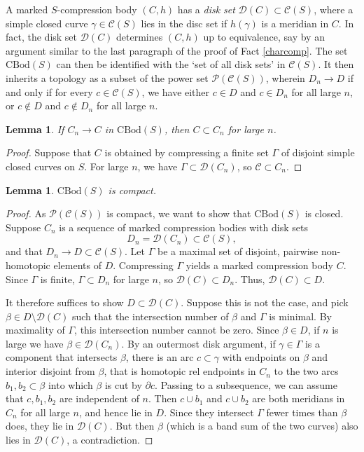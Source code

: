 \documentclass[12pt]{amsart}
\newtheorem{lemma}[theorem]{Lemma}
\theoremstyle{definition}
\theoremstyle{remark}
\begin{document}
A marked $S$-compression body $(C,h)$ has a \emph{disk set} $\mathcal D(C) \subset \mathcal C(S)$, where a simple closed curve $\gamma\in \mathcal C(S)$ lies in the disc set if $h(\gamma)$ is a meridian in $C$. In fact, the disk set $\mathcal D(C)$ determines $(C,h)$ up to equivalence, say by an argument similar to the last paragraph of the proof of Fact \ref{charcomp}. The set $\mathrm {CBod}(S) $ can then be identified with the `set of all disk sets' in $\mathcal C (S)$.  It then inherits a topology as a subset of the power set $\mathcal P( \mathcal C (S))$, wherein $D_n \to D$ if and only if for every $c\in \mathcal C(S)$, we have either $c\in D$ and $c\in D_n$ for all large $n$, or $c\not \in D$ and $c\not \in D_n$ for all large $n$.

\begin {lemma}\label {convergecontain}
If $C_n \to  C $ in $\mathrm {CBod}(S)$, then $C \subset C_n$ for large $n $.
\end {lemma}
\begin {proof}
Suppose that $C $ is obtained by compressing a finite set $\Gamma$ of disjoint simple closed curves on $S $.  For large $n $, we have $\Gamma \subset \mathcal D (C_n) $, so $\mathcal C \subset C_n $.
\end {proof}

\begin {lemma}
$\mathrm {CBod}(S) $ is compact.
\end {lemma}
\begin {proof}
As $\mathcal P( \mathcal C (S))$ is compact, we want to show that $\mathrm {CBod}(S)$ is closed. Suppose $C_n$ is a sequence of marked compression bodies with disk sets $$D_n = \mathcal D(C_n) \subset \mathcal C(S),$$ and that $D_n \to D \subset  \mathcal C(S)$. Let $\Gamma$ be a maximal set of disjoint, pairwise non-homotopic elements of $D$. Compressing $\Gamma$  yields a marked compression body $C$. Since $\Gamma$ is finite,  $\Gamma \subset D_n$ for large $n$, so $\mathcal D (C)  \subset D_n$.  Thus, $\mathcal D (C)  \subset D$.  

It therefore suffices to show $D \subset \mathcal D(C)$. Suppose this is not the case, and pick $\beta \in D\setminus \mathcal D(C)$ such that the intersection number of $\beta$ and $\Gamma$ is minimal. By maximality of $\Gamma$, this intersection number cannot be zero. Since $\beta\in D$, if $n $ is large we have $\beta\in \mathcal D(C_n)$. By an outermost disk argument, if $\gamma\in \Gamma$ is a component that intersects $\beta$, there is an arc $c\subset \gamma$ with endpoints on $\beta$ and interior disjoint from $\beta$, that is homotopic rel endpoints in $C_n$ to the two arcs $b_1,b_2\subset \beta$ into which $\beta$ is cut by $\partial c$. Passing to a subsequence, we can assume that $c,b_1,b_2$ are independent of $n$. Then $c \cup b_1$ and $c \cup b_2$ are both meridians in $C_n$ for all large $n$, and hence lie in $D$. Since they intersect $\Gamma$ fewer times than $\beta$ does, they lie in $\mathcal D(C)$. But then $\beta$ (which is a band sum of the two curves) also lies in $\mathcal D(C)$, a contradiction.
\end {proof}
\end{document}
